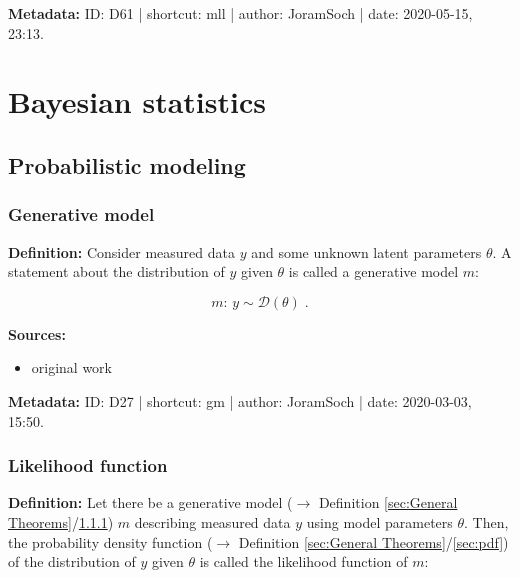 \documentclass[a4paper,12pt,twoside]{book}
\begin{document}
\vspace{1em}
\textbf{Metadata:} ID: D61 | shortcut: mll | author: JoramSoch | date: 2020-05-15, 23:13.
\vspace{1em}



\pagebreak
\section{Bayesian statistics}

\subsection{Probabilistic modeling}

\subsubsection[\textit{Generative model}]{Generative model} \label{sec:gm}
\setcounter{equation}{0}

\textbf{Definition:} Consider measured data $y$ and some unknown latent parameters $\theta$. A statement about the distribution of $y$ given $\theta$ is called a generative model $m$:

\begin{equation} \label{eq:gm-gm}
m: \, y \sim \mathcal{D}(\theta) \; .
\end{equation}


\vspace{1em}
\textbf{Sources:}
\begin{itemize}
\item original work\end{itemize}


\vspace{1em}
\textbf{Metadata:} ID: D27 | shortcut: gm | author: JoramSoch | date: 2020-03-03, 15:50.
\vspace{1em}



\subsubsection[\textit{Likelihood function}]{Likelihood function} \label{sec:lf}
\setcounter{equation}{0}

\textbf{Definition:} Let there be a generative model ($\rightarrow$ Definition \ref{sec:General Theorems}/\ref{sec:gm}) $m$ describing measured data $y$ using model parameters $\theta$. Then, the probability density function ($\rightarrow$ Definition \ref{sec:General Theorems}/\ref{sec:pdf}) of the distribution of $y$ given $\theta$ is called the likelihood function of $m$:
\end{document}
